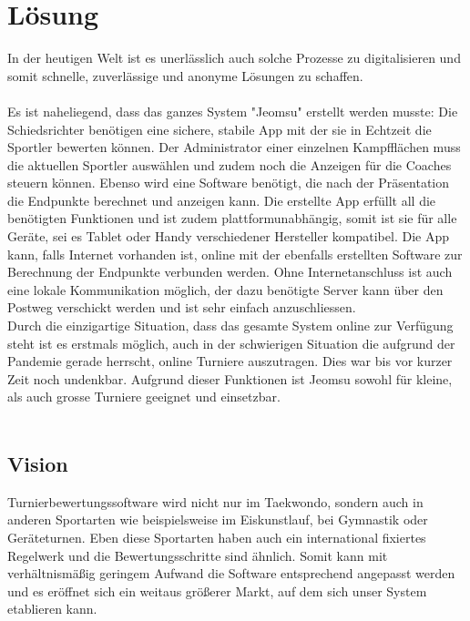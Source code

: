 \section{Lösung}
In der heutigen Welt ist es unerlässlich auch solche Prozesse zu digitalisieren und somit schnelle, zuverlässige und anonyme Lösungen zu schaffen.\\\\
Es ist naheliegend, dass das ganzes System "Jeomsu" erstellt werden musste:
Die Schiedsrichter benötigen eine sichere, stabile App mit der sie in Echtzeit die Sportler bewerten können. Der Administrator einer einzelnen Kampfflächen muss die aktuellen Sportler auswählen und zudem noch die Anzeigen für die Coaches steuern können. 
Ebenso wird eine Software benötigt, die nach der Präsentation die Endpunkte berechnet und anzeigen kann. 
Die erstellte App erfüllt all die benötigten Funktionen und ist zudem plattformunabhängig, somit ist sie für alle Geräte, sei es Tablet oder Handy verschiedener Hersteller kompatibel. Die App kann, falls Internet vorhanden ist, online mit der ebenfalls erstellten Software zur Berechnung der Endpunkte verbunden werden. Ohne Internetanschluss ist auch eine lokale Kommunikation möglich, der dazu benötigte Server kann über den Postweg verschickt werden und ist sehr einfach anzuschliessen.\\
Durch die einzigartige Situation, dass das gesamte System online zur Verfügung steht ist es erstmals möglich, auch in der schwierigen Situation die aufgrund der Pandemie gerade herrscht, online Turniere auszutragen. Dies war bis vor kurzer Zeit noch undenkbar.
Aufgrund dieser Funktionen ist Jeomsu sowohl für kleine, als auch grosse Turniere geeignet und einsetzbar.\\\\ 


\subsection{Vision}
Turnierbewertungssoftware wird nicht nur im Taekwondo, sondern auch in anderen Sportarten wie beispielsweise im Eiskunstlauf, bei Gymnastik oder Geräteturnen. Eben diese Sportarten haben auch ein international fixiertes Regelwerk und die Bewertungsschritte sind ähnlich. Somit kann mit verhältnismäßig geringem Aufwand die Software entsprechend angepasst werden und es eröffnet sich ein weitaus größerer Markt, auf dem sich unser System etablieren kann. 
